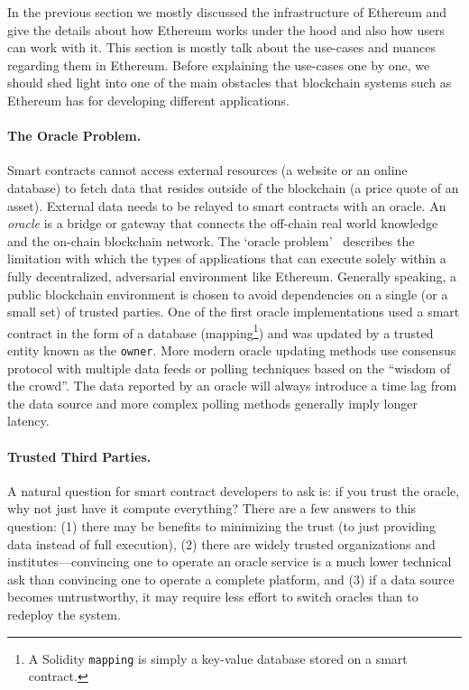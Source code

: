 In the previous section we mostly discussed the infrastructure of Ethereum and give the details about how Ethereum works under the hood and also how users can work with it. 
This section is mostly talk about the use-cases and nuances regarding them in Ethereum. Before explaining the use-cases one by one, we should shed light into one of the main obstacles that blockchain systems such as Ethereum has for developing different applications.


\paragraph{The Oracle Problem.}  

Smart contracts cannot access external resources (\eg a website or an online database) to fetch data that resides outside of the blockchain (\eg a price quote of an asset). External data needs to be relayed to smart contracts with an oracle. An \emph{oracle} is a bridge or gateway that connects the off-chain real world knowledge and the on-chain blockchain network. The `oracle problem'~\cite{linkOracleProblem} describes the limitation with which the types of applications that can execute solely within a fully decentralized, adversarial environment like Ethereum. Generally speaking, a public blockchain environment is chosen to avoid dependencies on a single (or a small set) of trusted parties. One of the first oracle implementations used a smart contract in the form of a database (\ie mapping\footnote{A Solidity \texttt{mapping} is simply a key-value database stored on a smart contract.}) and was updated by a trusted entity known as the \texttt{owner}. More modern oracle updating methods use consensus protocol with multiple data feeds or polling techniques based on the ``wisdom of the crowd''. The data reported by an oracle will always introduce a time lag from the data source and more complex polling methods generally imply longer latency.

\paragraph{Trusted Third Parties.} A natural question for smart contract developers to ask is: if you trust the oracle, why not just have it compute everything? There are a few answers to this question: (1) there may be benefits to minimizing the trust (\ie to just providing data instead of full execution), (2) there are widely trusted organizations and institutes---convincing one to operate an oracle service is a much lower technical ask than convincing one to operate a complete platform, and (3) if a data source becomes untrustworthy, it may require less effort to switch oracles than to redeploy the system. 

